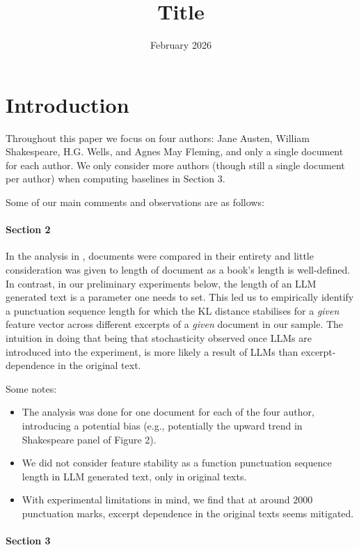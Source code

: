 \documentclass{article}
\title{Title}
\date{February 2026}
\begin{document}
\maketitle

\section{Introduction}

Throughout this paper we focus on four authors: Jane Austen, William Shakespeare, H.G. Wells, and Agnes
May Fleming, and only a single document for each author. We only consider more authors (though still a single document per author) when computing baselines in Section 3.  

Some of our main comments and observations are as follows:

\paragraph{Section 2}

In the analysis in \cite{punctuation_2021}, documents were compared in their entirety and little consideration was given to length of document as a book’s length is well-defined. In contrast, in our preliminary experiments below, the length of an LLM generated text is a parameter one needs to set. This led us to empirically identify a punctuation sequence length for which the KL distance stabilises for a \emph{given} feature vector across different excerpts of a \emph{given} document in our sample. The intuition in doing that being that stochasticity observed once LLMs are introduced into the experiment, is more likely a result of LLMs than excerpt-dependence in the original text.  

Some notes: 
\begin{itemize}
\item The analysis was done for one document for each of the four author, introducing a potential bias (e.g., potentially the upward trend in Shakespeare panel of Figure 2).
\item We did not consider feature stability as a function punctuation sequence length in LLM generated text, only in original texts. 
\item With experimental limitations in mind, we find that at around $2000$ punctuation marks, excerpt dependence in the original texts seems mitigated.
\end{itemize}

\paragraph{Section 3}
\end{document}
